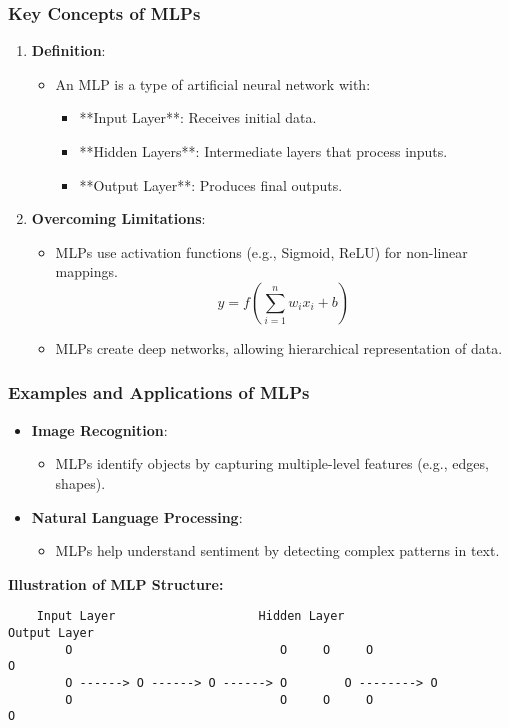 \documentclass[aspectratio=169]{beamer}
\begin{document}
\begin{frame}[fragile]
    \frametitle{Key Concepts of MLPs}
    \begin{enumerate}
        \item \textbf{Definition}:
        \begin{itemize}
            \item An MLP is a type of artificial neural network with:
            \begin{itemize}
                \item **Input Layer**: Receives initial data.
                \item **Hidden Layers**: Intermediate layers that process inputs.
                \item **Output Layer**: Produces final outputs.
            \end{itemize}
        \end{itemize}

        \item \textbf{Overcoming Limitations}:
        \begin{itemize}
            \item MLPs use activation functions (e.g., Sigmoid, ReLU) for non-linear mappings.
            \begin{equation}
                y = f\left(\sum_{i=1}^{n} w_i x_i + b\right)
            \end{equation}
            \item MLPs create deep networks, allowing hierarchical representation of data.
        \end{itemize}
    \end{enumerate}
\end{frame}

\begin{frame}[fragile]
    \frametitle{Examples and Applications of MLPs}
    \begin{itemize}
        \item \textbf{Image Recognition}:
        \begin{itemize}
            \item MLPs identify objects by capturing multiple-level features (e.g., edges, shapes).
        \end{itemize}
        
        \item \textbf{Natural Language Processing}:
        \begin{itemize}
            \item MLPs help understand sentiment by detecting complex patterns in text.
        \end{itemize}
    \end{itemize}

    \textbf{Illustration of MLP Structure:}
    \begin{verbatim}
    Input Layer                    Hidden Layer                      Output Layer
        O                             O     O     O                     O
        O ------> O ------> O ------> O        O --------> O
        O                             O     O     O                     O
    \end{verbatim}
\end{frame}
\end{document}
